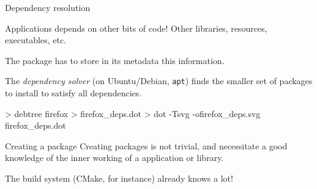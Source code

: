 \documentclass[compress]{beamer}
\begin{document}
\begin{frame}[fragile]{Dependency resolution}

Applications depends on other bits of code! Other libraries, resources,
executables, etc.

The package has to store in its metadata this information.

The \emph{dependency solver} (on Ubuntu/Debian, \texttt{apt}) finds the
smaller set of packages to install to satisfy all dependencies.

\pause

\begin{shcode}
> debtree firefox > firefox_deps.dot
> dot -Tsvg -ofirefox_deps.svg firefox_deps.dot
\end{shcode}

\end{frame}


\begin{frame}{Creating a package}
    Creating packages is not trivial, and necessitate a good knowledge of the
    inner working of a application or library.

    \pause

    The build system (CMake, for instance) already knows a lot!

\end{frame}
\end{document}
